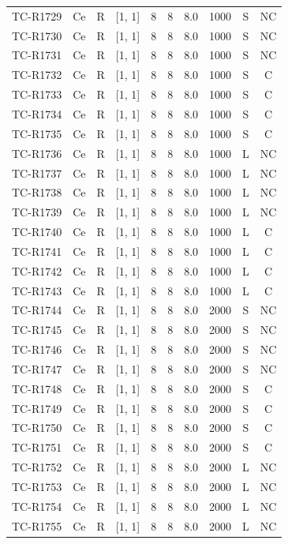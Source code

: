 \begin{longtable}{lccccccccc}
TC-R1729 & Ce & R & [1, 1] & 8 & 8 & 8.0 & 1000 & S & NC \\
TC-R1730 & Ce & R & [1, 1] & 8 & 8 & 8.0 & 1000 & S & NC \\
TC-R1731 & Ce & R & [1, 1] & 8 & 8 & 8.0 & 1000 & S & NC \\
TC-R1732 & Ce & R & [1, 1] & 8 & 8 & 8.0 & 1000 & S & C \\
TC-R1733 & Ce & R & [1, 1] & 8 & 8 & 8.0 & 1000 & S & C \\
TC-R1734 & Ce & R & [1, 1] & 8 & 8 & 8.0 & 1000 & S & C \\
TC-R1735 & Ce & R & [1, 1] & 8 & 8 & 8.0 & 1000 & S & C \\
TC-R1736 & Ce & R & [1, 1] & 8 & 8 & 8.0 & 1000 & L & NC \\
TC-R1737 & Ce & R & [1, 1] & 8 & 8 & 8.0 & 1000 & L & NC \\
TC-R1738 & Ce & R & [1, 1] & 8 & 8 & 8.0 & 1000 & L & NC \\
TC-R1739 & Ce & R & [1, 1] & 8 & 8 & 8.0 & 1000 & L & NC \\
TC-R1740 & Ce & R & [1, 1] & 8 & 8 & 8.0 & 1000 & L & C \\
TC-R1741 & Ce & R & [1, 1] & 8 & 8 & 8.0 & 1000 & L & C \\
TC-R1742 & Ce & R & [1, 1] & 8 & 8 & 8.0 & 1000 & L & C \\
TC-R1743 & Ce & R & [1, 1] & 8 & 8 & 8.0 & 1000 & L & C \\
TC-R1744 & Ce & R & [1, 1] & 8 & 8 & 8.0 & 2000 & S & NC \\
TC-R1745 & Ce & R & [1, 1] & 8 & 8 & 8.0 & 2000 & S & NC \\
TC-R1746 & Ce & R & [1, 1] & 8 & 8 & 8.0 & 2000 & S & NC \\
TC-R1747 & Ce & R & [1, 1] & 8 & 8 & 8.0 & 2000 & S & NC \\
TC-R1748 & Ce & R & [1, 1] & 8 & 8 & 8.0 & 2000 & S & C \\
TC-R1749 & Ce & R & [1, 1] & 8 & 8 & 8.0 & 2000 & S & C \\
TC-R1750 & Ce & R & [1, 1] & 8 & 8 & 8.0 & 2000 & S & C \\
TC-R1751 & Ce & R & [1, 1] & 8 & 8 & 8.0 & 2000 & S & C \\
TC-R1752 & Ce & R & [1, 1] & 8 & 8 & 8.0 & 2000 & L & NC \\
TC-R1753 & Ce & R & [1, 1] & 8 & 8 & 8.0 & 2000 & L & NC \\
TC-R1754 & Ce & R & [1, 1] & 8 & 8 & 8.0 & 2000 & L & NC \\
TC-R1755 & Ce & R & [1, 1] & 8 & 8 & 8.0 & 2000 & L & NC \\

\end{longtable}

